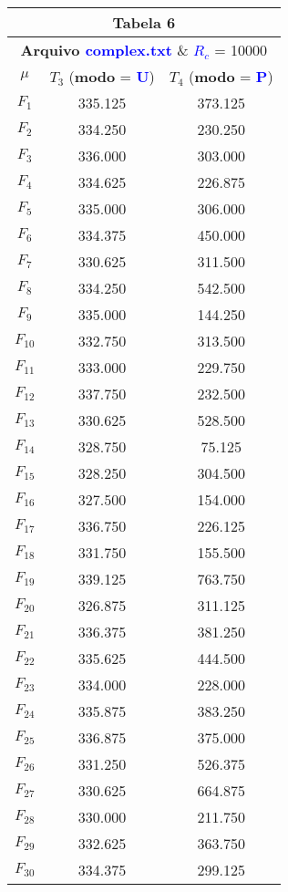 \documentclass[11pt]{article}
\begin{document}
\pagebreak

\begin{table}[!h]
	\begin{center}
		\begin{tabular}{| c | c | c |}
		\hline
		\multicolumn{3}{|c|}{\textbf{Tabela 6}} \\ \hline
		\multicolumn{3}{|c|}{\textbf{Arquivo \textcolor{blue}{complex.txt}} \& \textbf{\textcolor{blue}{$R_c$}} = 10000  } \\ \hline
			$\mu$ & $T_3$ (\textbf{modo} = \textbf{\textcolor{blue}{U}}) & $T_4$ (\textbf{modo} = \textbf{\textcolor{blue}{P}}) \\ \hline 
			$F_1$ & 335.125 & 373.125 \\ \hline
			$F_2$ & 334.250 & 230.250 \\ \hline
			$F_3$ & 336.000 & 303.000 \\ \hline
			$F_4$ & 334.625 & 226.875 \\ \hline
			$F_5$ & 335.000 & 306.000 \\ \hline
			$F_6$ & 334.375 & 450.000 \\ \hline
			$F_7$ & 330.625 & 311.500 \\ \hline
			$F_8$ & 334.250 & 542.500 \\ \hline
			$F_9$ & 335.000 & 144.250 \\ \hline
			$F_{10}$ & 332.750 & 313.500 \\ \hline
			$F_{11}$ & 333.000 & 229.750 \\ \hline
			$F_{12}$ & 337.750 & 232.500 \\ \hline
			$F_{13}$ & 330.625 & 528.500 \\ \hline
			$F_{14}$ & 328.750 & 75.125  \\ \hline
			$F_{15}$ & 328.250 & 304.500 \\ \hline
			$F_{16}$ & 327.500 & 154.000 \\ \hline
			$F_{17}$ & 336.750 & 226.125 \\ \hline
			$F_{18}$ & 331.750 & 155.500 \\ \hline
			$F_{19}$ & 339.125 & 763.750 \\ \hline
			$F_{20}$ & 326.875 & 311.125 \\ \hline
			$F_{21}$ & 336.375 & 381.250 \\ \hline
			$F_{22}$ & 335.625 & 444.500 \\ \hline
			$F_{23}$ & 334.000 & 228.000 \\ \hline
			$F_{24}$ & 335.875 & 383.250 \\ \hline
			$F_{25}$ & 336.875 & 375.000 \\ \hline
			$F_{26}$ & 331.250 & 526.375 \\ \hline
			$F_{27}$ & 330.625 & 664.875 \\ \hline
			$F_{28}$ & 330.000 & 211.750 \\ \hline
			$F_{29}$ & 332.625 & 363.750 \\ \hline
			$F_{30}$ & 334.375 & 299.125 \\ \hline
		\end{tabular}
	\end{center}
\end{table}
\end{document}
